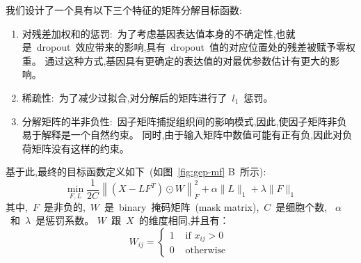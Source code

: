 我们设计了一个具有以下三个特征的矩阵分解目标函数:
\begin{enumerate}
    \item 对残差加权和的惩罚:~为了考虑基因表达值本身的不确定性,也就是~dropout~效应带来的影响,具有~dropout~值的对应位置处的残差被赋予零权重。
          通过这种方式,基因具有更确定的表达值的对最优参数估计有更大的影响。
    \item 稀疏性:~为了减少过拟合,对分解后的矩阵进行了~$l_1$~惩罚。
    \item 分解矩阵的半非负性:~因子矩阵捕捉组织间的影响模式,因此,使因子矩阵非负易于解释是一个自然约束。
          同时,由于输入矩阵中数值可能有正有负,因此对负荷矩阵没有这样的约束。
\end{enumerate}
基于此,最终的目标函数定义如下~(如图~\ref{fig:gep-mf} B~所示):
\begin{equation}
    \label{eq:obj}
    \min _{F, L} \frac{1}{2 C}\left\|\left(X-L F^{T}\right) \odot W\right\|_{F}^{2}+\alpha\|L\|_{1}+\lambda\|F\|_{1}
\end{equation}
其中,~$F$~是非负的,~$W$~是~binary~掩码矩阵~(mask matrix),~$C$~是细胞个数,
~$\alpha$~和~$\lambda$~是惩罚系数。
$W$~跟~$X$~的维度相同,并且有：
\begin{equation}
    W_{i j}=\left\{\begin{array}{ll}1 & \text { if } x_{i j}>0 \\ 0 & \text { otherwise }\end{array}\right.
\end{equation}

